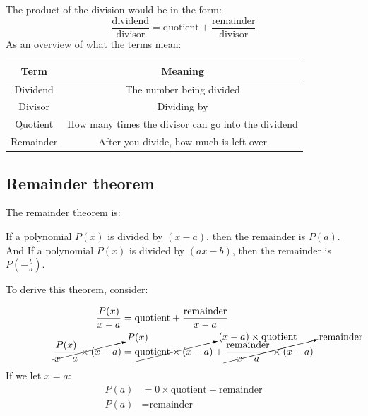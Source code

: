 \documentclass{report}
\begin{document}
The product of the division would be in the form:
$$
	\frac{\text{dividend}}{\text{divisor}} = \text{quotient} + \frac{\text{remainder}}{\text{divisor}}
$$
As an overview of what the terms mean:
\begin{center}
	\begin{tabular}{c|c}
		Term      & Meaning                                             \\ \hline
		Dividend  & The number being divided                            \\
		Divisor   & Dividing by                                         \\
		Quotient  & How many times the divisor can go into the dividend \\
		Remainder & After you divide, how much is left over
	\end{tabular}
\end{center}

\subsection{Remainder theorem}
The remainder theorem is:
\begin{center}
	If a polynomial $P(x)$ is divided by $(x - a)$, then the remainder is $P(a)$.\\
	And If a polynomial $P(x)$ is divided by $(ax - b)$, then the remainder is $P(-\frac{b}{a})$.
\end{center}

To derive this theorem, consider:
\begin{center}
	\begin{align*}
		\frac{P(x)}{x - a}                                 & = \text{quotient} + \frac{\text{remainder}}{x - a}                                                                                                       \\
		\cancelto{P(x)}{\frac{P(x)}{x - a} \times (x - a)} & = \cancelto{(x - a) \times \text{quotient}}{\text{quotient} \times (x - a)} + \cancelto{\text{remainder}}{\frac{\text{remainder}}{x - a} \times (x - a)}
	\end{align*}
	If we let $x = a$:
	\begin{align*}
		P(a) & = 0 \times \text{quotient} + \text{remainder} \\
		P(a) & = \text{remainder}
	\end{align*}
\end{center}
\end{document}
